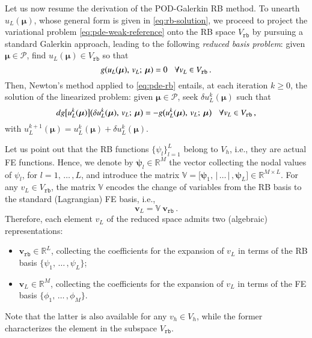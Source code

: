 \documentclass{elsarticle}
\theoremstyle{theorem}
\theoremstyle{definition}
\theoremstyle{remark}
\theoremstyle{proposition}
\numberwithin{figure}{section}
\newcommand{\bg}[1]{\boldsymbol{#1}}
\begin{document}
		Let us now resume the derivation of the POD-Galerkin RB method. To unearth $u_L(\bg{\mu})$, whose general form is given in \eqref{eq:rb-solution}, we proceed to project the variational problem \eqref{eq:pde-weak-reference} onto the RB space $V_{\texttt{rb}}$ by pursuing a standard Galerkin approach, leading to the following \emph{reduced basis problem}: given $\bg{\mu} \in \mathcal{P}$, find $u_L(\bg{\mu}) \in V_{\texttt{rb}}$ so that
		\begin{equation}
			\label{eq:pde-rb}
			g(u_L(\bg{\mu}), \, v_L; \, \bg{\mu}) = 0 \hspace*{0.3cm} \forall v_L \in V_{\texttt{rb}} \, .
		\end{equation}
		Then, Newton's method applied to \eqref{eq:pde-rb} entails, at each iteration $k \geq 0$, the solution of the linearized problem: given $\bg{\mu} \in \mathcal{P}$, seek $\delta u_{L}^k(\bg{\mu})$ such that
		\begin{equation*}
			\label{eq:pde-rb-newton}
			dg \big[ u_{L}^k(\bg{\mu}) \big] \big( \delta u_{L}^k(\bg{\mu}), \, v_{L}; \, \bg{\mu} \big) = - g \big( u_{L}^k(\bg{\mu}), \, v_{L}; \, \bg{\mu} \big) \hspace*{0.3cm} \forall v_{L} \in V_{\texttt{rb}} \, ,
		\end{equation*}
		with $u_{L}^{k+1}(\bg{\mu}) = u_{L}^k(\bg{\mu}) + \delta u_{L}^k(\bg{\mu})$.
		
		Let us point out that the RB functions $\big\lbrace \psi_l \big\rbrace_{l = 1}^L$ belong to $V_h$, i.e., they are actual FE functions. Hence, we denote by $\bg{\psi}_l \in \mathbb{R}^M$ the vector collecting the nodal values of $\psi_l$, for $l = 1, \, \ldots \, , L$, and introduce the matrix $\mathbb{V} = \big[ \bg{\psi}_1, \, \big| \, \ldots \, \big| \, , \bg{\psi}_L \big] \in \mathbb{R}^{M \times L}$. For any $v_{L} \in V_{\texttt{rb}}$, the matrix $\mathbb{V}$ encodes the change of variables from the RB basis to the standard (Lagrangian) FE basis, i.e.,
		\begin{equation}
			\label{eq:rb-fe-coefficients}
			\mathbf{v}_L = \mathbb{V} ~ \mathbf{v}_{\texttt{rb}} \, .
		\end{equation}
		Therefore, each element $v_{L}$ of the reduced space admits two (algebraic) representations:
		\begin{itemize}
			\item $\mathbf{v}_{\texttt{rb}} \in \mathbb{R}^L$, collecting the coefficients for the expansion of $v_{L}$ in terms of the RB basis $\big\lbrace \psi_1, \, \ldots \, , \psi_L \big\rbrace$;
			\item $\mathbf{v}_{L} \in \mathbb{R}^M$, collecting the coefficients for the expansion of $v_{L}$ in terms of the FE basis $\big\lbrace \phi_1, \, \ldots \, , \phi_M \big\rbrace$.
		\end{itemize}
		Note that the latter is also available for any $v_h \in V_h$, while the former characterizes the element in the subspace $V_{\texttt{rb}}$.
		
\end{document}
